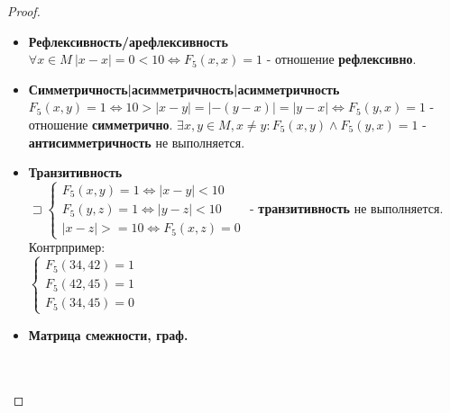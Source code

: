 \begin{proof} $ $
	\begin{itemize}
  	\item \textbf{Рефлексивность/арефлексивность \\}
  	\( \forall x \in M ~ |x - x| = 0 < 10 \Leftrightarrow F_5(x,x) = 1 \) - отношение \textbf{рефлексивно}.
  	\item \textbf{Симметричность|асимметричность|асимметричность \\}
  	\( F_5(x,y) = 1 \Leftrightarrow 10>|x-y|=|-(y-x)|=|y-x| \Leftrightarrow F_5(y,x) = 1 \) - отношение \textbf{симметрично}.
  	\( \exists x,y \in M, x \neq y : F_5(x,y) \land F_5(y, x) = 1 \) - \textbf{антисимметричность} не выполняется.
  	\item \textbf{Транзитивность \\}
  	\( \sqsupset
  	\begin{cases}
    F_5(x,y) = 1 \Leftrightarrow |x-y|<10 \\
    F_5(y,z) = 1 \Leftrightarrow |y-z|<10 \\
    |x-z|>=10 \Leftrightarrow F_5(x,z) = 0   
  	\end{cases} \) - \textbf{транзитивность} не выполняется. \\
  	Контрпример: \\
  	\( \begin{cases}
    F_5(34,42) = 1 \\
    F_5(42,45) = 1 \\
    F_5(34,45) = 0  
  	\end{cases}  \)
  	\item \textbf{Матрица смежности, граф. \\}
	\\ \\ 
\end{itemize}
\end{proof}
